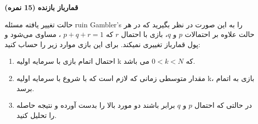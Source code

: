 \Large \textbf{قمارباز بازنده}
\large \textbf{(15 نمره)}

\normalsize \vspace{0.5cm}

حالت تغییر یافته مسئله ruin Gambler's را به این صورت در نظر بگیرید که در هر حالت علاوه بر احتمالات $p$ و $q$،‌ بازی با احتمال $r$ که
$p + q + r = 1$
، مساوی می‌شود و پول قمارباز تغییری نمیکند. برای این بازی موارد زیر را حساب کنید:

\begin{enumerate}[label=(\alph*)]
	
	\item
	احتمال اتمام بازی با سرمایه اولیه k که
	$0 < k < N$
	می باشد.
	\item
	مقدار متوسطی زمانی که لازم است که با شروع با سرمایه اولیه k، بازی به اتمام برسد.
	\item
	در حالتی که احتمال $p$ و $q$ برابر باشند دو مورد بالا را بدست آورده و نتیجه حاصله را تحلیل کنید.
	
\end{enumerate}